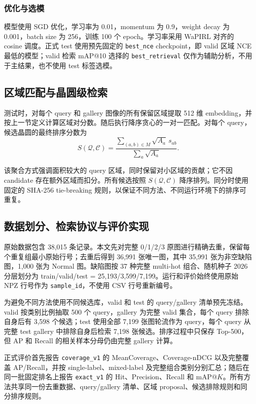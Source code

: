 \documentclass[UTF8,a4paper,11pt,fontset=fandol]{ctexart}
\newcommand{\coveragevone}{\texttt{coverage\_v1}}
\newcommand{\exactvone}{\texttt{exact\_v1}}
\newcommand{\bestnce}{\texttt{best\_nce}}
\newcommand{\bestretrieval}{\texttt{best\_retrieval}}
\begin{document}
\subsubsection{优化与选模}

模型使用 SGD 优化，学习率为 0.01，momentum 为 0.9，weight decay 为 0.001，batch size 为 256，训练 100 个 epoch。学习率采用 WaPIRL 对齐的 cosine 调度。正式 test 使用预先固定的 \bestnce{} checkpoint，即 valid 区域 NCE 最低的模型；valid 检索 mAP@10 选择的 \bestretrieval{} 仅作为辅助分析，不用于主结果，也不使用 test 标签选模。

\subsection{区域匹配与晶圆级检索}

测试时，对每个 query 和 gallery 图像的所有保留区域提取 512 维 embedding，并按上一节定义计算区域对分数。随后执行降序贪心的一对一匹配。对每个 query，候选晶圆的最终排序分数为
\[
S(\mathcal{Q},\mathcal{C})=
\frac{\sum_{(a,b)\in M}\sqrt{A_a}\,s_{ab}}
{\sum_a\sqrt{A_a}}.
\]

该聚合方式强调面积较大的 query 区域，同时保留对小区域的贡献；它不因 candidate 存在额外区域而扣分。所有候选按照 \(S(\mathcal{Q},\mathcal{C})\) 降序排列。同分时使用固定的 SHA-256 tie-breaking 规则，以保证不同方法、不同运行环境下的排序可重复。

\subsection{数据划分、检索协议与评价实现}

原始数据包含 38,015 条记录。本文先对完整 0/1/2/3 原图进行精确去重，保留每个重复组最小原始行号；去重后得到 36,991 张唯一图，其中 35,991 张为非空缺陷图，1,000 张为 Normal 图。缺陷图按 37 种完整 multi-hot 组合、随机种子 2026 分层划分为 train/valid/test = 25,193/3,599/7,199。运行和评价始终使用原始 NPZ 行号作为 \texttt{sample\_id}，不使用 CSV 行号重新编号。

为避免不同方法使用不同候选库，valid 和 test 的 query/gallery 清单预先冻结。valid 按类别比例抽取 500 个 query，gallery 为完整 valid 集合，每个 query 排除自身后有 3,598 个候选；test 使用全部 7,199 张图轮流作为 query，每个 query 从完整 test gallery 中排除自身后检索 7,198 张候选。排序过程中只保存 Top-500，但 AP 和 Recall 的相关样本分母仍由完整 gallery 计算。

正式评价首先报告 \coveragevone{} 的 MeanCoverage、Coverage-nDCG 以及完整覆盖 AP/Recall，并按 single-label、mixed-label 及完整组合类别分别汇总；随后在同一批固定排名上报告 \exactvone{} 的 Hit、Precision、Recall 和 mAP@\(K\)。所有方法共享同一份去重数据、query/gallery 清单、区域 proposal、候选排除规则和同分排序规则。
\end{document}
